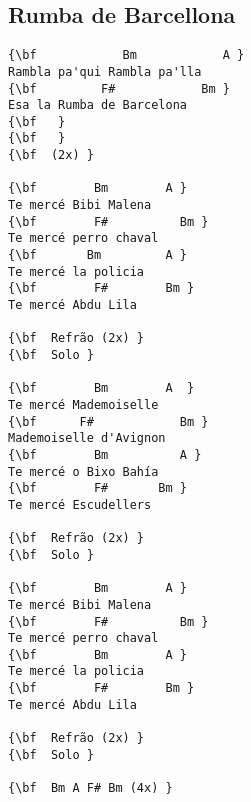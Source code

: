 \documentclass[a4paper]{article}
\begin{document}
\subsection{Rumba de Barcellona}
\begin{multicols}{2}\begin{Verbatim}[commandchars=\\\{\}]
{\bf            Bm            A }
Rambla pa'qui Rambla pa'lla 
{\bf         F#            Bm }
Esa la Rumba de Barcelona 
{\bf  ￼}
{\bf   }
{\bf  (2x) }

{\bf        Bm        A }
Te mercé Bibi Malena 
{\bf        F#          Bm }
Te mercé perro chaval 
{\bf       Bm         A }
Te mercé la policia 
{\bf        F#        Bm }
Te mercé Abdu Lila 

{\bf  Refrão (2x) }
{\bf  Solo }

{\bf        Bm        A  }
Te mercé Mademoiselle 
{\bf      F#            Bm }
Mademoiselle d'Avignon 
{\bf        Bm          A }
Te mercé o Bixo Bahía  
{\bf        F#       Bm }
Te mercé Escudellers 

{\bf  Refrão (2x) }
{\bf  Solo }

{\bf        Bm        A }
Te mercé Bibi Malena 
{\bf        F#          Bm }
Te mercé perro chaval 
{\bf        Bm        A }
Te mercé la policia 
{\bf        F#        Bm }
Te mercé Abdu Lila 

{\bf  Refrão (2x) }
{\bf  Solo }

{\bf  Bm A F# Bm (4x) }

\end{Verbatim}
\end{multicols}\newpage
\end{document}
